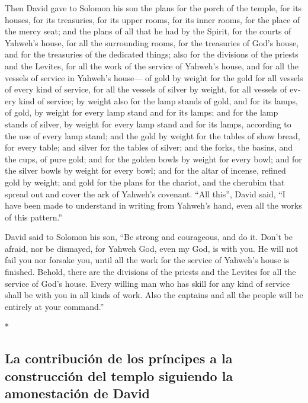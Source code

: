 \begin{paracol}{2}
\begin{otherlanguage}{english}
 Then David gave to Solomon his son the plans for the
porch of the temple, for its houses, for its treasuries, for its upper
rooms, for its inner rooms, for the place of the mercy seat;
 and the plans of all that he had by the Spirit, for the
courts of Yahweh's house, for all the surrounding rooms, for the
treasuries of God's house, and for the treasuries of the dedicated
things;  also for the divisions of the priests and the
Levites, for all the work of the service of Yahweh's house, and for all
the vessels of service in Yahweh's house---  of gold by
weight for the gold for all vessels of every kind of service, for all
the vessels of silver by weight, for all vessels of every kind of
service;  by weight also for the lamp stands of gold, and
for its lamps, of gold, by weight for every lamp stand and for its
lamps; and for the lamp stands of silver, by weight for every lamp stand
and for its lamps, according to the use of every lamp stand;
 and the gold by weight for the tables of show bread, for
every table; and silver for the tables of silver;  and
the forks, the basins, and the cups, of pure gold; and for the golden
bowls by weight for every bowl; and for the silver bowls by weight for
every bowl;  and for the altar of incense, refined gold
by weight; and gold for the plans for the chariot, and the cherubim that
spread out and cover the ark of Yahweh's covenant.  ``All
this'', David said, ``I have been made to understand in writing from
Yahweh's hand, even all the works of this pattern.''

 David said to Solomon his son, ``Be strong and
courageous, and do it. Don't be afraid, nor be dismayed, for Yahweh God,
even my God, is with you. He will not fail you nor forsake you, until
all the work for the service of Yahweh's house is finished.
 Behold, there are the divisions of the priests and the
Levites for all the service of God's house. Every willing man who has
skill for any kind of service shall be with you in all kinds of work.
Also the captains and all the people will be entirely at your command.''

\end{otherlanguage}

\switchcolumn[0]*

\hypertarget{la-contribuciuxf3n-de-los-pruxedncipes-a-la-construcciuxf3n-del-templo-siguiendo-la-amonestaciuxf3n-de-david}{%
\subsection{La contribución de los príncipes a la construcción del
templo siguiendo la amonestación de
David}\label{la-contribuciuxf3n-de-los-pruxedncipes-a-la-construcciuxf3n-del-templo-siguiendo-la-amonestaciuxf3n-de-david}}


\end{paracol}

